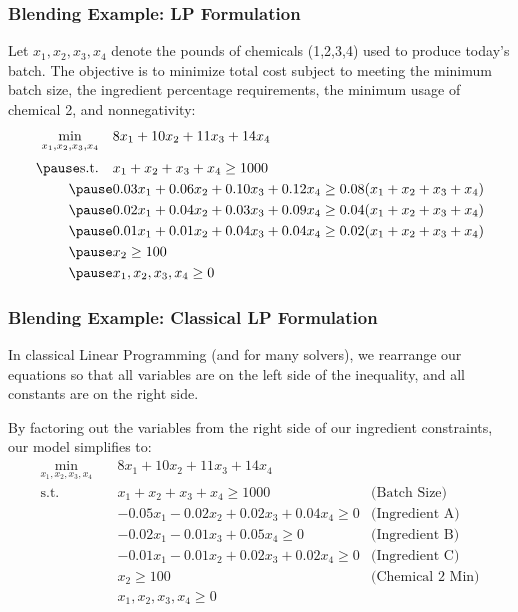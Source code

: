 \documentclass{beamer}
\begin{document}
\begin{frame}[shrink]
\frametitle{Blending Example: LP Formulation}
Let \(x_1,x_2,x_3,x_4\) denote the pounds of chemicals (1,2,3,4) used to produce today’s batch. The objective is to minimize total cost subject to meeting the minimum batch size, the ingredient percentage requirements, the minimum usage of chemical 2, and nonnegativity:
\pause
\[
\begin{aligned}
\min_{x_1,x_2,x_3,x_4}\quad
& 8x_1 + 10x_2 + 11x_3 + 14x_4 \\[0.5ex]\pause
\text{s.t.}\quad
& x_1 + x_2 + x_3 + x_4 \ge 1000\\\pause
& 0.03x_1 + 0.06x_2 + 0.10x_3 + 0.12x_4 \ge 0.08(x_1+x_2+x_3+x_4)\\\pause
& 0.02x_1 + 0.04x_2 + 0.03x_3 + 0.09x_4 \ge 0.04(x_1+x_2+x_3+x_4)\\\pause
& 0.01x_1 + 0.01x_2 + 0.04x_3 + 0.04x_4 \ge 0.02(x_1+x_2+x_3+x_4)\\\pause
& x_2 \ge 100 \\\pause
& x_1, x_2, x_3, x_4 \ge 0
\end{aligned}
\]
\end{frame}

\begin{frame}[shrink]
\frametitle{Blending Example: Classical LP Formulation}
In classical Linear Programming (and for many solvers), we rearrange our equations so that all variables are on the left side of the inequality, and all constants are on the right side.

\vspace{0.3cm}
By factoring out the variables from the right side of our ingredient constraints, our model simplifies to:
\[
\begin{aligned}
\min_{x_1,x_2,x_3,x_4}\quad
& 8x_1 + 10x_2 + 11x_3 + 14x_4 \\[0.5ex]
\text{s.t.}\quad
& x_1 + x_2 + x_3 + x_4 \ge 1000 & \text{(Batch Size)}\\
& -0.05x_1 - 0.02x_2 + 0.02x_3 + 0.04x_4 \ge 0 & \text{(Ingredient A)}\\
& -0.02x_1 - 0.01x_3 + 0.05x_4 \ge 0 & \text{(Ingredient B)}\\
& -0.01x_1 - 0.01x_2 + 0.02x_3 + 0.02x_4 \ge 0 & \text{(Ingredient C)}\\
& x_2 \ge 100 & \text{(Chemical 2 Min)}\\
& x_1, x_2, x_3, x_4 \ge 0
\end{aligned}
\]
\end{frame}
\end{document}
